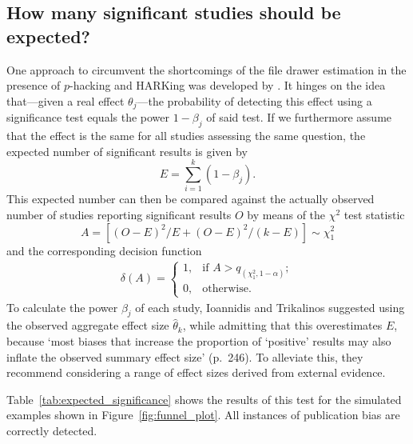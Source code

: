 \subsection{How many significant studies should be expected?}
One approach to circumvent the shortcomings of the file drawer estimation in the presence of $p$-hacking and HARKing was developed by \citet{ioannidis_exploratory_2007}. It hinges on the idea that---given a real effect $\theta_j$---the probability of detecting this effect using a significance test equals the power $1-\beta_j$ of said test. If we furthermore assume that the effect is the same for all studies assessing the same question, the expected number of significant results is given by $$E = \sum_{i=1}^k (1-\beta_j).$$This expected number can then be compared against the actually observed number of studies reporting significant results $O$ by means of the $\chi^2$ test statistic $$A = [(O-E)^2/E + (O-E)^2/(k-E)] \sim \chi_1^2$$ 
and the corresponding decision function
\begin{align*}
    \delta(A) = \begin{cases} 1, & \text{if } A > q_{(\chi_1^2,1-\alpha)}; \\ 0, & \mbox{otherwise}.\end{cases}
\end{align*}
To calculate the power $\beta_j$ of each study, Ioannidis and Trikalinos suggested using the observed aggregate effect size $\hat{\theta}_k$, while admitting that this overestimates $E$, because `most biases that increase the proportion of `positive' results may also inflate the observed summary effect size' (p.~246). To alleviate this, they recommend considering a range of effect sizes derived from external evidence.\par
Table~\ref{tab:expected_significance} shows the results of this test for the simulated examples shown in Figure~\ref{fig:funnel_plot}. All instances of publication bias are correctly detected.\par
